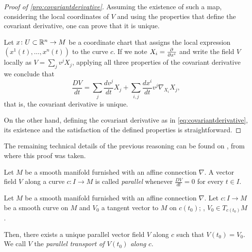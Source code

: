 \begin{proof}[Proof of \autoref{pro:covariantderivative}]
	Assuming the existence of such a map, considering the local coordinates of $V$ and using the properties that define the covariant derivative, one can prove that it is unique.
	
	Let $x \colon U \subset \mathbb{R}^n \to M$ be a coordinate chart that assigns the local expression $(x^1(t), \dots, x^n(t))$ to the curve $c$. If we note $X_i = \frac{\partial^{} }{\partial x^i}$ and write the field $V$ locally as $V = \sum_j v^j X_j$, applying all three properties of the covariant derivative we conclude that
	\begin{equation}
		\label{eq:covariantderivative}
		\frac{DV}{dt} = \sum_j \frac{d v^j}{dt} X_j + \sum_{i,j} \frac{d x^i}{dt} v^j \nabla_{X_i} X_j,
	\end{equation}
	that is, the covariant derivative is unique.
	
	On the other hand, defining the covariant derivative as in \autoref{eq:covariantderivative}, its existence and the satisfaction of the defined properties is straightforward.
\end{proof}

The remaining technical details of the previous reasoning can be found on \cite[p. 43]{docarmo79}, from where this proof was taken.

\begin{definition}
	Let $M$ be a smooth manifold furnished with an affine connection $\nabla$. A vector field $V$ along a curve $c \colon I \to M$ is called \emph{parallel} whenever $\frac{DV}{dt} = 0$ for every $t \in I$.
\end{definition}

\begin{proposition}[Parallel transport]
	Let $M$ be a smooth manifold furnished with an affine connection $\nabla$. Let $c \colon I \to M$ be a smooth curve on $M$ and $V_0$ a tangent vector to $M$ on $c(t_0)$; \ie, $V_0 \in T_{c(t_0)} M$.
	
	Then, there exists a unique parallel vector field $V$ along $c$ such that $V(t_0) = V_0$. We call $V$ the \emph{parallel transport of $V(t_0)$ along $c$}.
\end{proposition}

